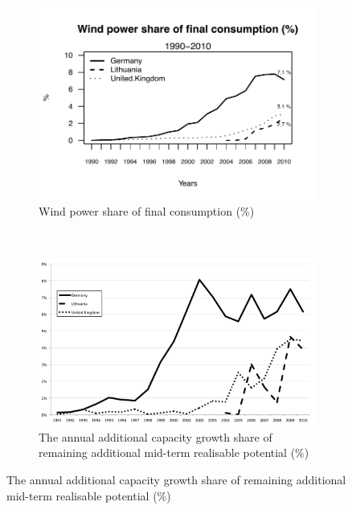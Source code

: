 \documentclass[a4paper, 12pt]{article}
\begin{document}
\begin{figure}
	\centering
	\begin{subfigure}[b]{1\textwidth}
		\includegraphics[width=1\textwidth]{figure_generation-share2}
		\caption{Wind power share of final consumption (\%)}
		\label{fig:figure_generation-share2}
	\end{subfigure}
	~
	\begin{subfigure}[b]{1\textwidth}
		\includegraphics[width=1\textwidth]{fig_growth-potential}
		\caption{The annual additional capacity growth share of remaining additional mid-term realisable potential (\%)}
		\label{fig:fig_growth-potential}
	\end{subfigure}
\end{figure}
\end{document}
